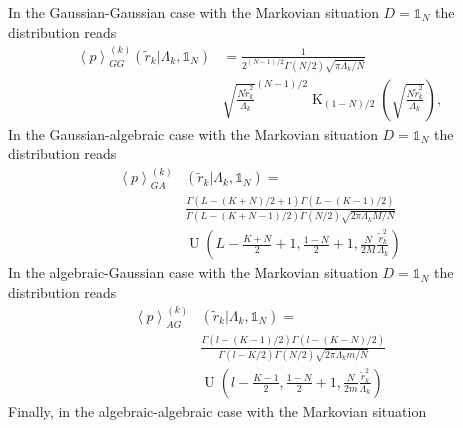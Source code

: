 In the Gaussian-Gaussian case with the Markovian situation $D = \mathbb{1}_{N}$
the distribution reads
\begin{equation}
    \begin{split}
    \left\langle p \right\rangle_{GG}^{\left(k\right)}
    \left(\tilde{r}_{k} \vert \Lambda_{k}, \mathbb{1}_{N}\right) &=
    \frac{1}{2^{\left(N - 1\right) / 2} \Gamma \left(N / 2\right)
    \sqrt{\pi \Lambda_{k} / N}} \\
    & \sqrt{\frac{N \tilde{r}_{k}^2}{\Lambda_{k}}}^{\left(N - 1\right) / 2}
    \operatorname{K}_{\left(1 - N\right)/2}
    \left( \sqrt{\frac{N \tilde{r}^2_{k}}{\Lambda_{k}}}\right),
    \end{split}
\end{equation}
In the Gaussian-algebraic case with the Markovian situation
$D = \mathbb{1}_{N}$ the distribution reads
\begin{equation}
    \begin{split}
    \left\langle p \right\rangle_{GA}^{\left(k\right)} &
    \left(\tilde{r}_{k} \vert \Lambda_{k}, \mathbb{1}_{N}\right) = \\
    &\frac{\Gamma\left(L - \left(K + N \right) / 2 + 1\right)
    \Gamma\left(L - \left(K - 1\right) / 2\right)}
    {\Gamma\left(L - \left(K + N - 1\right) / 2\right) \Gamma\left(N / 2\right)
    \sqrt{2\pi \Lambda_{k}M/N}} \\
    & \operatorname{U} \left(L - \frac{K + N}{2} + 1, \frac{1 - N}{2} + 1,
    \frac{N}{2M} \frac{\tilde{r}^{2}_{k}}{\Lambda_{k}}\right)
    \end{split}
\end{equation}
In the algebraic-Gaussian case with the Markovian situation
$D = \mathbb{1}_{N}$ the distribution reads
\begin{equation}
    \begin{split}
    \left\langle p \right\rangle_{AG}^{\left(k\right)} &
    \left(\tilde{r}_{k} \vert \Lambda_{k}, \mathbb{1}_{N}\right) = \\
    &\frac{\Gamma\left(l - \left(K - 1 \right) / 2\right)
    \Gamma\left(l - \left(K - N\right) / 2\right)}
    {\Gamma\left(l - K / 2\right) \Gamma\left(N / 2\right)
    \sqrt{2\pi \Lambda_{k}m/N}} \\
    & \operatorname{U} \left(l - \frac{K - 1}{2}, \frac{1 - N}{2} + 1,
    \frac{N}{2m} \frac{\tilde{r}^{2}_{k}}{\Lambda_{k}}\right)
    \end{split}
\end{equation}
Finally, in the algebraic-algebraic case with the Markovian situation
